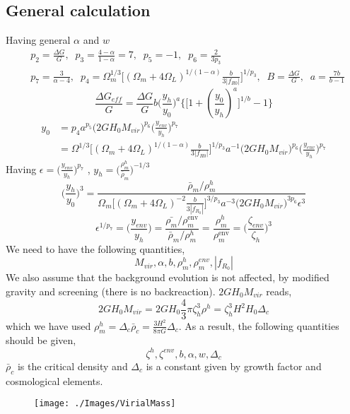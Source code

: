 \documentclass[a4paper,10pt]{article}
\def\be{\begin{equation}}
\def\ee{\end{equation}}
\begin{document}
\subsection{General calculation}
Having general $\alpha$ and $w$
\begin{align}
 & p_2 = \frac{\Delta G}{G}, \; \;  p_3 = \frac{4-\alpha}{1-\alpha} = 7,\; \; p_5=-1, \; \; p_6= \frac2 {3 p_3} \\ & \nonumber
 p_7=\frac{3}{\alpha -4 },  \; \; p_4=\Omega_m^{1/3} \Big[ (\Omega_m + 4\Omega_L)^{1/(1-\alpha)}  \frac{b}{3 |f_{R0}|}\Big]^{1/p_3},   \; \;  B = \frac{\Delta G}{G}, \; \; a = \frac{7b}{b-1}
\end{align} 
\be
\frac{\Delta G_{eff}}{G} = \frac{\Delta G}{G} b \Big (\frac{y_h}{y_0} \Big)^{a} \Big\{ \big[ 1+ (\frac{y_0}{y_h})^a \big]^{1/b}  -1 \Big\}
\ee
\begin{align}
y_0  &= p_4 a^{p_5} \Big( 2 G H_0 M_{vir} \Big)^{p_6} \Big(\frac{y_{env}}{y_h} \Big)^{p_7} \nonumber \\ &
=\Omega^{1/3} \Big[ (\Omega_m + 4\Omega_L)^{1/(1-\alpha)}  \frac{b}{3 |f_{R0}|}\Big]^{1/p_3}  a^{-1} \big( 2 G H_0 M_{vir} \big)^{p_6} \Big( \frac{y_{env}}{y_h} \Big)^{p_7}
\end{align}
Having $\epsilon = \Big( \frac{y_{env}}{y_h} \Big)^{p_7}$ , $y_h=\big( \frac{\rho_m^h}{\bar{\rho}_m} \big)^{-1/3}$
\be
\Big(\frac{y_h}{y_0} \Big)^{3} = \frac{\bar{\rho}_m/\rho_m^h}{\Omega_m \Big[ (\Omega_m + 4 \Omega_L) ^{-2} \frac{b}{3 |f_{R_0}|} \Big]^{3/p_3} a^{-3} \big( 2 G H_0 M_{vir} \big)^{3 p_6}  \epsilon ^3}
\ee
\be
\epsilon^{1/p_7} = \Big( \frac{y_{env}}{y_h} \Big) = \frac{\bar{\rho_m}/ \rho_m^{\text{env}}}{\bar{\rho}_m/\rho_m^h} = \frac{\rho_m^h}{\rho_m^{\text{env}}} = \Big( \frac{\zeta_{env}}{\zeta_h} \Big) ^3
\ee
We need to have the following quantities,
\be
M_{vir}, \alpha, b, \rho_m^h, \rho_m^{env}, |f_{R_0}|
\ee
We also assume that the background evolution is not affected, by modified gravity and screening (there is no backreaction). 
 $2 G H_0 M_{vir}$ reads,
 \be
 2 G H_0  M_{vir}  = 2 G H_0   \frac43 \pi \zeta_h^3 \rho^h = \zeta_h^3 H ^2 H_0 \Delta_c
 \ee
 which we have used  $\rho_m^h =\Delta_c \bar{\rho}_c = \frac{3 H^2}{8 \pi G } \Delta_c$. As a result, the following quantities should be given,
 \be
 \zeta^h, \zeta^{env}, b, \alpha, w, \Delta_c
 \ee
 $\bar{\rho}_c$ is the critical density and $\Delta_c$ is a constant given by growth factor and cosmological elements.
 
      \begin{figure}[H]
 \texttt{[image: ./Images/VirialMass]}  
 \end{figure} 
 
\end{document}
